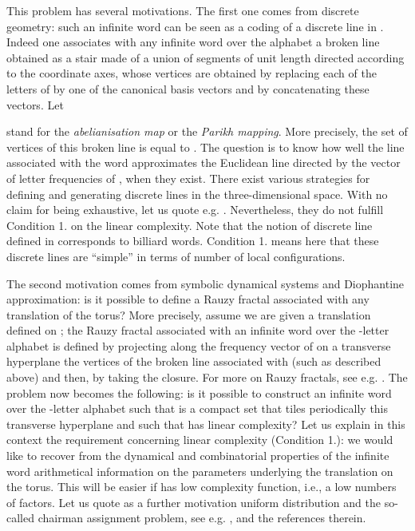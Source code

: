 \documentclass[preliminary,copyright,creativecommons]{eptcs}
\begin{document}
This problem   has  several motivations.   The first one  comes  from  discrete geometry:    such  an infinite word
can be seen as a coding  of a discrete  line in . Indeed  one associates with      any infinite word
over the alphabet   a  broken line     obtained   as a  stair made of a  union of segments of unit length  directed  according to the  coordinate axes, 
 whose  vertices  are obtained    by replacing each of the letters   of   by one of the      canonical  basis    vectors
 and by concatenating these vectors.  Let 
  
    stand for  the {\em   abelianisation map}   or 
   the {\em Parikh mapping}.
   More precisely, the set of vertices  of  this broken line    is  equal to 
 . The question is to know how  well the line  associated with the word   approximates  the   Euclidean line
  directed by the  vector  of letter  frequencies of ,  when they exist.    There exist   various    strategies  for defining and generating discrete lines in the three-dimensional space. With no claim
   for being exhaustive, let us quote  e.g.
\cite{andres,BB09,FigRev96,toutant_characterization_2006}. 
Nevertheless, they    do not   fulfill     Condition  1.  on the linear complexity. Note that the  notion of discrete line  defined  in \cite{andres} corresponds
to billiard  words.      Condition 1. means here   that  these  discrete lines  are  ``simple'' in terms of number of local configurations.


The second motivation comes from   symbolic dynamical systems and  Diophantine approximation:
is it possible  to define a Rauzy fractal     associated  with any   translation  of the  torus?
More precisely,   assume   we are given a      translation    defined on ;     the  Rauzy fractal  associated  with   an infinite  word   over  the -letter alphabet  is defined  
  by  projecting    along  the  frequency vector of    on a transverse   hyperplane  the vertices   of the broken line associated with 
  (such as described   above)  and   then, by  taking the closure. For more on Rauzy fractals, see  e.g.  \cite{BertheSiegel2005}. The problem now becomes the following:
   is it    possible  to construct an infinite  word   over  the -letter alphabet 
 such that
 is a  compact set that tiles periodically this transverse hyperplane and such that
 has linear complexity? Let us explain in this context the  requirement  concerning linear  complexity (Condition 1.):  we would like to recover from  the
dynamical and combinatorial properties of the  infinite  word   arithmetical information   on the parameters  underlying the  translation on the torus.
This will be easier if      has low complexity function,  i.e., a low  numbers of factors.  
Let us quote as a further motivation uniform distribution and   the  so-called   chairman assignment problem, see  e.g.   \cite{tij},  and the references  therein.
 
\end{document}
